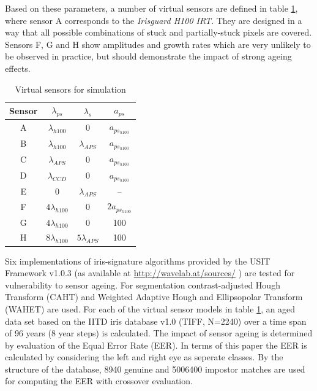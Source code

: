 \documentclass[10pt,twocolumn,letterpaper]{article}
\begin{document}
\egroup

 Based on these parameters, a number of virtual sensors are defined in table \ref{table:tests}, where sensor A corresponds to the \emph{Irisguard H100 IRT}. They are designed in a way that all possible combinations of stuck and partially-stuck pixels are covered. Sensors F, G and H show amplitudes and growth rates which are very unlikely to be observed in practice, but should demonstrate the impact of strong ageing effects. 
 
 \begin{table}[bt]  
  \begin{center}
  \begin{tabular}{c | c c c }
  Sensor & $\lambda_{ps}$ & $\lambda_{s}$ & $a_{ps}$  \\
  \hline
  A	&	$\lambda_{h100}$ & 0 & $a_{ps_{h100}}$ \\
  B & $\lambda_{h100}$ & $\lambda_{APS}$ & $a_{ps_{h100}}$ \\
  C & $\lambda_{APS}$ & 0 & $a_{ps_{h100}}$    \\
  D & $\lambda_{CCD}$ & 0 & $a_{ps_{h100}}$   \\
  E & 0 & $\lambda_{APS}$ & -- \\
  F & $ 4 \lambda_{h100}$ & 0 & $ 2 a_{ps_{h100}}$ \\
  G & $ 4 \lambda_{h100}$ & 0 & 100 \\
  H & $ 8 \lambda_{h100}$ &  $ 5 \lambda_{APS}$ & 100

  \end{tabular}
    
    \vspace{3mm}
    \caption{Virtual sensors for simulation}
    \label{table:tests}
  \end{center}
 \end{table}
  
  Six implementations 
  of iris-signature algorithms provided by the USIT Framework v1.0.3 (as available at \url{http://wavelab.at/sources/} \cite{rathgeb}) are tested for vulnerability to sensor ageing. For segmentation contrast-adjusted Hough Transform (CAHT) and Weighted Adaptive Hough and Ellipsopolar Transform (WAHET) are used. For each of the virtual sensor models in table \ref{table:tests}, an aged data set based on the IITD iris database v1.0 (TIFF, N=2240) \cite{IITD} over a time span of 96 years (8 year steps) is calculated. The impact of sensor ageing is determined by evaluation of the Equal Error Rate (EER). In terms of this paper the EER is calculated by considering the left and right eye as seperate classes. By the structure of the database, 8940 genuine and 5006400 impostor matches are used for computing the EER with crossover evaluation.
  
\end{document}

